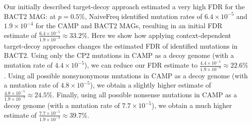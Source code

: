 Our initially described target-decoy approach estimated a very high FDR for the BACT2 MAG:
at $p = 0.5\%$, NaiveFreq identified mutation rates of $6.4 \times 10^{-5}$ and $1.9 \times 10^{-4}$ for the CAMP and BACT2 MAGs, resulting in an initial FDR estimate of $\frac{6.4 \times 10^{-5}}{1.9 \times 10^{-4}} \approx 33.2\%$.
%
Here we show how applying context-dependent target-decoy approaches changes the estimated FDR of identified mutations in BACT2.
%
Using only the CP2 mutations in CAMP as a decoy genome (with a mutation rate of $4.4 \times 10^{-5}$), we can reduce our FDR estimate to $\frac{4.4 \times 10^{-5}}{1.9 \times 10^{-4}} \approx 22.6\%$.
%
Using all possible nonsynonymous mutations in CAMP as a decoy genome (with a mutation rate of $4.8 \times 10^{-5}$), we obtain a slightly higher estimate of $\frac{4.8 \times 10^{-5}}{1.9 \times 10^{-4}} \approx 24.5\%$.
%
Finally, using all possible nonsense mutations in CAMP as a decoy genome (with a mutation rate of $7.7 \times 10^{-5}$), we obtain a much higher estimate of $\frac{7.7 \times 10^{-5}}{1.9 \times 10^{-4}} \approx 39.7\%$.
\endinput